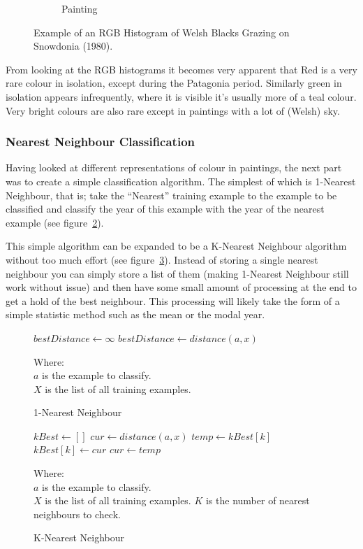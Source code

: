 \documentclass[11pt,fleqn,twoside]{article}
\begin{document}
\begin{figure}[h]
\begin{subfigure}[b]{0.4\textwidth}
  \caption{Painting}
\end{subfigure}
\caption{Example of an RGB Histogram of Welsh Blacks Grazing on Snowdonia (1980).}
\label{fig:histogram}
\end{figure}

From looking at the RGB histograms it becomes very apparent that Red is a very rare colour in 
isolation, except during the Patagonia period. Similarly green in isolation appears infrequently,
where it is visible it's usually more of a teal colour. Very bright colours are also rare except
in paintings with a lot of (Welsh) sky.

\clearpage
\subsubsection{Nearest Neighbour Classification}
Having looked at different representations of colour in paintings, the next part was to create a 
simple classification algorithm. The simplest of which is 1-Nearest Neighbour, that is; take the 
``Nearest'' training example to the example to be classified and classify the year of this example 
with the year of the nearest example (see figure~\ref{fig:1-nn}).

This simple algorithm can be expanded to be a K-Nearest Neighbour algorithm without too much effort
(see figure~\ref{fig:k-nn}). Instead of storing a single nearest neighbour you can simply store a
list of them (making 1-Nearest Neighbour still work without issue) and then have some small amount
of processing at the end to get a hold of the best neighbour. This processing will likely take the
form of a simple statistic method such as the mean or the modal year.

\begin{figure}[h]
\begin{algorithmic}
\State $bestDistance \gets \infty$
		\State $bestDistance \gets distance(a, x)$
	\EndIf
\EndFor
\end{algorithmic}

Where:\\
\(a\) is the example to classify.\\
\(X\) is the list of all training examples.
\caption{1-Nearest Neighbour}
\label{fig:1-nn}
\end{figure}

\begin{figure}[h]
\begin{algorithmic}
\State $kBest \gets []$
	\State $cur \gets distance(a, x)$
			\State $temp \gets kBest[k]$
			\State $kBest[k] \gets cur$
			\State $cur \gets temp$
		\EndIf
	\EndFor
\EndFor
\end{algorithmic}
Where:\\
$a$ is the example to classify.\\
$X$ is the list of all training examples.
$K$ is the number of nearest neighbours to check.
\caption{K-Nearest Neighbour}
\label{fig:k-nn}
\end{figure}
\end{document}
